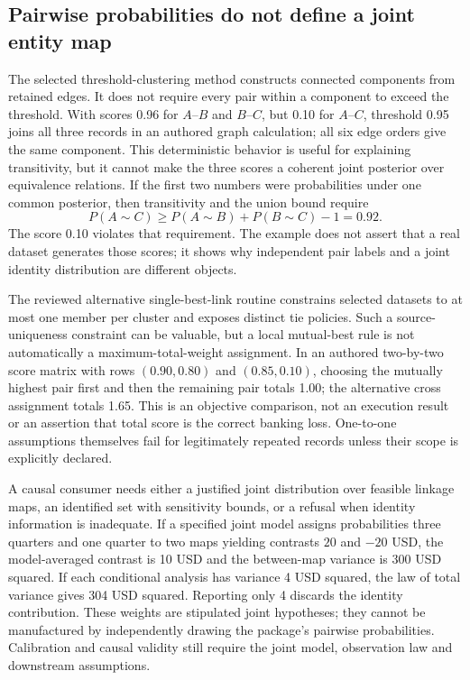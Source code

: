 \subsection{Pairwise probabilities do not define a joint entity map}
The selected threshold-clustering method constructs connected components from retained edges. It does not require every pair within a component to exceed the threshold. With scores 0.96 for $A$--$B$ and $B$--$C$, but 0.10 for $A$--$C$, threshold 0.95 joins all three records in an authored graph calculation; all six edge orders give the same component. This deterministic behavior is useful for explaining transitivity, but it cannot make the three scores a coherent joint posterior over equivalence relations. If the first two numbers were probabilities under one common posterior, then transitivity and the union bound require
\[P(A\sim C)\geq P(A\sim B)+P(B\sim C)-1=0.92.\]
The score 0.10 violates that requirement. The example does not assert that a real dataset generates those scores; it shows why independent pair labels and a joint identity distribution are different objects.\citep{exec24_splink_sources,exec24_splink_contract}

The reviewed alternative single-best-link routine constrains selected datasets to at most one member per cluster and exposes distinct tie policies. Such a source-uniqueness constraint can be valuable, but a local mutual-best rule is not automatically a maximum-total-weight assignment. In an authored two-by-two score matrix with rows $(0.90,0.80)$ and $(0.85,0.10)$, choosing the mutually highest pair first and then the remaining pair totals 1.00; the alternative cross assignment totals 1.65. This is an objective comparison, not an execution result or an assertion that total score is the correct banking loss. One-to-one assumptions themselves fail for legitimately repeated records unless their scope is explicitly declared.\citep{exec24_splink_sources,exec24_splink_contract}

A causal consumer needs either a justified joint distribution over feasible linkage maps, an identified set with sensitivity bounds, or a refusal when identity information is inadequate. If a specified joint model assigns probabilities three quarters and one quarter to two maps yielding contrasts $20$ and $-20$ USD, the model-averaged contrast is 10 USD and the between-map variance is 300 USD squared. If each conditional analysis has variance 4 USD squared, the law of total variance gives 304 USD squared. Reporting only 4 discards the identity contribution. These weights are stipulated joint hypotheses; they cannot be manufactured by independently drawing the package's pairwise probabilities. Calibration and causal validity still require the joint model, observation law and downstream assumptions.\citep{exec24_splink_contract}

